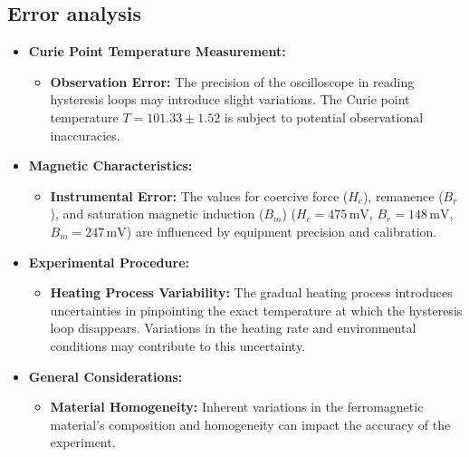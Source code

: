 \documentclass[UTF8]{article}
\begin{document}
\subsection{Error analysis}
\begin{itemize}
    \item \textbf{Curie Point Temperature Measurement:}
    \begin{itemize}
        \item \textbf{Observation Error:} The precision of the oscilloscope in reading hysteresis loops may introduce slight variations. The Curie point temperature \(T = 101.33 \pm 1.52\) is subject to potential observational inaccuracies.
    \end{itemize}
    
    \item \textbf{Magnetic Characteristics:}
    \begin{itemize}
        \item \textbf{Instrumental Error:} The values for coercive force (\(H_c\)), remanence (\(B_r\)), and saturation magnetic induction (\(B_m\)) (\(H_c = 475 \, \text{mV}\), \(B_r = 148 \, \text{mV}\), \(B_m = 247 \, \text{mV}\)) are influenced by equipment precision and calibration.
    \end{itemize}
    
    \item \textbf{Experimental Procedure:}
    \begin{itemize}
        \item \textbf{Heating Process Variability:} The gradual heating process introduces uncertainties in pinpointing the exact temperature at which the hysteresis loop disappears. Variations in the heating rate and environmental conditions may contribute to this uncertainty.
    \end{itemize}
    
    \item \textbf{General Considerations:}
    \begin{itemize}
        \item \textbf{Material Homogeneity:} Inherent variations in the ferromagnetic material's composition and homogeneity can impact the accuracy of the experiment.
    \end{itemize}
\end{itemize}
\end{document}
